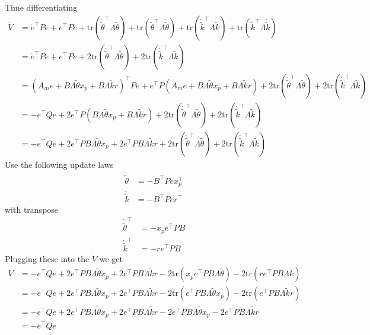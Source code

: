 Time differentiating
\begin{align*}
  \dot{V}
  &
  =\dot{e}^{\top}Pe
  +e^{\top}P\dot{e}
  +\text{tr}\left(\dot{\tilde{\theta}}^{\top}\Lambda\tilde{\theta}\right)
  +\text{tr}\left(\tilde{\theta}^{\top}\Lambda\dot{\tilde{\theta}}\right)
  +\text{tr}\left(\dot{\tilde{k}}^{\top}\Lambda\tilde{k}\right)
  +\text{tr}\left(\tilde{k}^{\top}\Lambda\dot{\tilde{k}}\right) \\
  &
  =\dot{e}^{\top}Pe
  +e^{\top}P\dot{e}
  +2\text{tr}\left(\dot{\tilde{\theta}}^{\top}\Lambda\tilde{\theta}\right)
  +2\text{tr}\left(\dot{\tilde{k}}^{\top}\Lambda\tilde{k}\right) \\
  &
  =(A_{m}e+B\Lambda\tilde{\theta}x_{p}+B\Lambda\tilde{k}r)^{\top}Pe
  +e^{\top}P(A_{m}e+B\Lambda\tilde{\theta}x_{p}+B\Lambda\tilde{k}r)
  +2\text{tr}\left(\dot{\tilde{\theta}}^{\top}\Lambda\tilde{\theta}\right)
  +2\text{tr}\left(\dot{\tilde{k}}^{\top}\Lambda\tilde{k}\right) \\
  &
  =-e^{\top}Qe
  +2e^{\top}P(B\Lambda\tilde{\theta}x_{p}+B\Lambda\tilde{k}r)
  +2\text{tr}\left(\dot{\tilde{\theta}}^{\top}\Lambda\tilde{\theta}\right)
  +2\text{tr}\left(\dot{\tilde{k}}^{\top}\Lambda\tilde{k}\right) \\
  &
  =-e^{\top}Qe
  +2e^{\top}PB\Lambda\tilde{\theta}x_{p}+2e^{\top}PB\Lambda\tilde{k}r
  +2\text{tr}\left(\dot{\tilde{\theta}}^{\top}\Lambda\tilde{\theta}\right)
  +2\text{tr}\left(\dot{\tilde{k}}^{\top}\Lambda\tilde{k}\right)
\end{align*}
Use the following update laws
\begin{align*}
  \dot{\tilde{\theta}}&=-B^{\top}Pex_{p}^{\top} \\
  \dot{\tilde{k}}&=-B^{\top}Per^{\top}
\end{align*}
with transpose
\begin{align*}
  \dot{\tilde{\theta}}^{\top}&=-x_{p}e^{\top}PB \\
  \dot{\tilde{k}}^{\top}&=-re^{\top}PB
\end{align*}
Plugging these into the $\dot{V}$ we get
\begin{align*}
  \dot{V}&=-e^{\top}Qe
  +2e^{\top}PB\Lambda\tilde{\theta}x_{p}+2e^{\top}PB\Lambda\tilde{k}r
  -2\text{tr}\left(x_{p}e^{\top}PB\Lambda\tilde{\theta}\right)
  -2\text{tr}\left(re^{\top}PB\Lambda\tilde{k}\right) \\
  &=-e^{\top}Qe
  +2e^{\top}PB\Lambda\tilde{\theta}x_{p}+2e^{\top}PB\Lambda\tilde{k}r
  -2\text{tr}\left(e^{\top}PB\Lambda\tilde{\theta}x_{p}\right)
  -2\text{tr}\left(e^{\top}PB\Lambda\tilde{k}r\right) \\
  &=-e^{\top}Qe
  +2e^{\top}PB\Lambda\tilde{\theta}x_{p}+2e^{\top}PB\Lambda\tilde{k}r
  -2e^{\top}PB\Lambda\tilde{\theta}x_{p}
  -2e^{\top}PB\Lambda\tilde{k}r \\
  &=-e^{\top}Qe
\end{align*}

